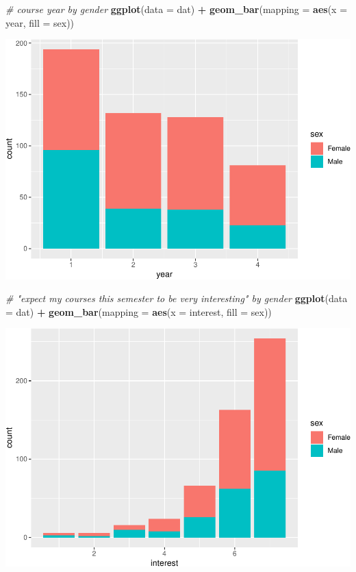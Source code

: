 \documentclass[]{article}
\newenvironment{Shaded}{\begin{snugshade}}{\end{snugshade}}
\newcommand{\CommentTok}[1]{\textcolor[rgb]{0.56,0.35,0.01}{\textit{#1}}}
\newcommand{\DataTypeTok}[1]{\textcolor[rgb]{0.13,0.29,0.53}{#1}}
\newcommand{\KeywordTok}[1]{\textcolor[rgb]{0.13,0.29,0.53}{\textbf{#1}}}
\newcommand{\NormalTok}[1]{#1}
\newcommand{\OperatorTok}[1]{\textcolor[rgb]{0.81,0.36,0.00}{\textbf{#1}}}
\newcommand{\StringTok}[1]{\textcolor[rgb]{0.31,0.60,0.02}{#1}}
\begin{document}
\begin{Shaded}
\begin{Highlighting}[]
\CommentTok{# course year by gender}
\KeywordTok{ggplot}\NormalTok{(}\DataTypeTok{data =}\NormalTok{ dat) }\OperatorTok{+}\StringTok{ }
\StringTok{  }\KeywordTok{geom_bar}\NormalTok{(}\DataTypeTok{mapping =} \KeywordTok{aes}\NormalTok{(}\DataTypeTok{x =}\NormalTok{ year, }\DataTypeTok{fill =}\NormalTok{ sex))}
\end{Highlighting}
\end{Shaded}

\includegraphics{StudentGoals_files/figure-latex/unnamed-chunk-11-10.pdf}

\begin{Shaded}
\begin{Highlighting}[]
\CommentTok{# "expect my courses this semester to be very interesting" by gender}
\KeywordTok{ggplot}\NormalTok{(}\DataTypeTok{data =}\NormalTok{ dat) }\OperatorTok{+}\StringTok{ }
\StringTok{  }\KeywordTok{geom_bar}\NormalTok{(}\DataTypeTok{mapping =} \KeywordTok{aes}\NormalTok{(}\DataTypeTok{x =}\NormalTok{ interest, }\DataTypeTok{fill =}\NormalTok{ sex))}
\end{Highlighting}
\end{Shaded}

\includegraphics{StudentGoals_files/figure-latex/unnamed-chunk-11-11.pdf}
\end{document}
